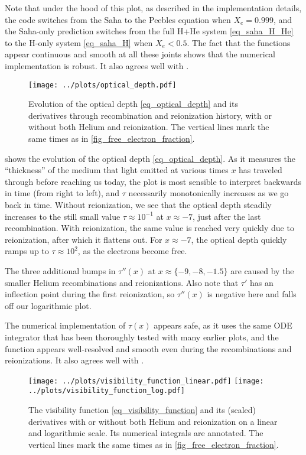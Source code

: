 \documentclass[10pt,a4paper]{article}
\begin{document}
Note that under the hood of this plot, as described in the implementation details,
the code switches from the Saha to the Peebles equation when $X_e = 0.999$,
and the Saha-only prediction switches from the full H+He system \eqref{eq_saha_H_He} to the H-only system \eqref{eq_saha_H} when $X_e < 0.5$.
The fact that the functions appear continuous and smooth at all these joints shows that the numerical implementation is robust.
It also agrees well with \cite[\textsc{fig. 1}]{callinHowCalculateCMB2006}.

\begin{figure}
	\centering
	\texttt{[image: ../plots/optical\_depth.pdf]}
	\caption{Evolution of the optical depth \eqref{eq_optical_depth} and its derivatives through recombination and reionization history, with or without both Helium and reionization. The vertical lines mark the same times as in \cref{fig_free_electron_fraction}.}
	\label{fig_optical_depth}
\end{figure}

 shows the evolution of the optical depth \eqref{eq_optical_depth}.
As it measures the ``thickness'' of the medium that light emitted at various times $x$ has traveled through before reaching us today,
the plot is most sensible to interpret backwards in time (from right to left), and $\tau$ necessarily monotonically increases as we go back in time.
Without reionization, we see that the optical depth steadily increases to the still small value $\tau \approx 10^{-1}$ at $x \approx -7$, just after the last recombination.
With reionization, the same value is reached very quickly due to reionization, after which it flattens out.
For $x \approx -7$, the optical depth quickly ramps up to $\tau \approx 10^{2}$, as the electrons become free.

The three additional bumps in $\tau''(x)$ at $x \approx \{-9, -8, -1.5\}$ are caused by the smaller Helium recombinations and reionizations.
Also note that $\tau'$ has an inflection point during the first reionization,
so $\tau''(x)$ is negative here and falls off our logarithmic plot.

The numerical implementation of $\tau(x)$ appears safe, as it uses the same ODE integrator that has been thoroughly tested with many earlier plots,
and the function appears well-resolved and smooth even during the recombinations and reionizations.
It also agrees well with \cite[\textsc{fig. 2}]{callinHowCalculateCMB2006}.

\begin{figure}
	\centering
	\texttt{[image: ../plots/visibility\_function\_linear.pdf]}
	\texttt{[image: ../plots/visibility\_function\_log.pdf]}
	\caption{The visibility function \eqref{eq_visibility_function} and its (scaled) derivatives with or without both Helium and reionization on a linear and logarithmic scale. Its numerical integrals are annotated. The vertical lines mark the same times as in \cref{fig_free_electron_fraction}.}
	\label{fig_visibility_function}
\end{figure}
\end{document}
